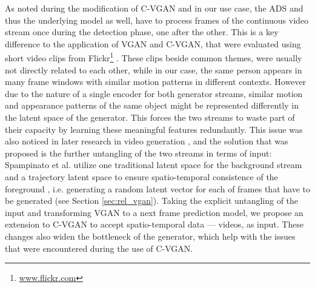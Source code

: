As noted during the modification of C-VGAN and in our use case, the ADS and thus the underlying model as well, have to process frames of the continuous video stream once during the detection phase, one after the other. This is a key difference to the application of VGAN and C-VGAN, that were evaluated using short video clips from Flickr\footnote{\url{www.flickr.com}} \cite{vondrick2016generating}. These clips beside common themes, were usually not directly related to each other, while in our case, the same person appears in many frame windows with similar motion patterns in different contexts. However due to the nature of a single encoder for both generator streams, similar motion and appearance patterns of the same object might be represented differently in the latent space of the generator. This forces the two streams to waste part of their capacity by learning these meaningful features redundantly. This issue was also noticed in later research in video generation \cite{tulyakov2018mocogan, spampinato2018vos, spampinato2019adversarial}, and the solution that was proposed is the further untangling of the two streams in terms of input: Spampinato et al. utilize one traditional latent space for the background stream and a trajectory latent space to ensure spatio-temporal consistence of the foreground \cite{spampinato2019adversarial}, i.e. generating a random latent vector for each of frames that have to be generated (see Section \ref{sec:rel_vgan}). Taking the explicit untangling of the input and transforming VGAN to a next frame prediction model, we propose an extension to C-VGAN to accept spatio-temporal data --- videos, as input. These changes also widen the bottleneck of the generator, which help with the issues that were encountered during the use of C-VGAN.

